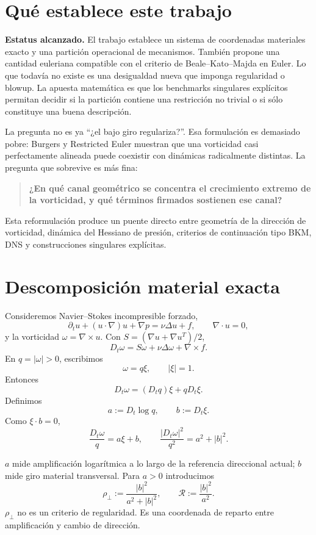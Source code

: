 \documentclass[11pt]{article}
\newcommand{\Dt}{D_t}
\newcommand{\rhoT}{\rho_{\perp}}
\newenvironment{statusbox}{\begin{mdframed}[backgroundcolor=boxbg,linecolor=rule,linewidth=0.6pt,roundcorner=2pt,innerleftmargin=10pt,innerrightmargin=10pt,innertopmargin=8pt,innerbottommargin=8pt]}{\end{mdframed}}
\begin{document}
\section{Qué establece este trabajo}

\begin{statusbox}
\textbf{Estatus alcanzado.} El trabajo establece un sistema de coordenadas materiales exacto y una partición operacional de mecanismos. También propone una cantidad euleriana compatible con el criterio de Beale--Kato--Majda en Euler. Lo que todavía no existe es una desigualdad nueva que imponga regularidad o blowup. La apuesta matemática es que los benchmarks singulares explícitos permitan decidir si la partición contiene una restricción no trivial o si sólo constituye una buena descripción.
\end{statusbox}

La pregunta no es ya ``¿el bajo giro regulariza?''. Esa formulación es demasiado pobre: Burgers y Restricted Euler muestran que una vorticidad casi perfectamente alineada puede coexistir con dinámicas radicalmente distintas. La pregunta que sobrevive es más fina:

\begin{quote}
\textbf{¿En qué canal geométrico se concentra el crecimiento extremo de la vorticidad, y qué términos firmados sostienen ese canal?}
\end{quote}

Esta reformulación produce un puente directo entre geometría de la dirección de vorticidad, dinámica del Hessiano de presión, criterios de continuación tipo BKM, DNS y construcciones singulares explícitas.

\section{Descomposición material exacta}

Consideremos Navier--Stokes incompresible forzado,
\[
\partial_tu+(u\cdot\nabla)u+\nabla p=\nu\Delta u+f,
\qquad \nabla\cdot u=0,
\]
y la vorticidad $\omega=\nabla\times u$. Con $S=(\nabla u+\nabla u^T)/2$,
\[
\Dt\omega=S\omega+\nu\Delta\omega+\nabla\times f.
\]
En $q=|\omega|>0$, escribimos
\[
\omega=q\xi,\qquad |\xi|=1.
\]
Entonces
\[
\Dt\omega=(\Dt q)\xi+q\Dt\xi.
\]
Definimos
\[
a:=\Dt\log q,\qquad b:=\Dt\xi.
\]
Como $\xi\cdot b=0$,
\[
\boxed{\frac{\Dt\omega}{q}=a\xi+b},
\qquad
\boxed{\frac{|\Dt\omega|^2}{q^2}=a^2+|b|^2}.
\]

$a$ mide amplificación logarítmica a lo largo de la referencia direccional actual; $b$ mide giro material transversal. Para $a>0$ introducimos
\[
\rhoT:=\frac{|b|^2}{a^2+|b|^2},
\qquad
\mathscr R:=\frac{|b|^2}{a^2}.
\]
$\rhoT$ no es un criterio de regularidad. Es una coordenada de reparto entre amplificación y cambio de dirección.
\end{document}
